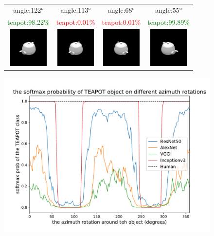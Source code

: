\begin{figure}[t]
\tabcolsep=0.03cm
   \begin{tabular}{cccc}
   angle:\ang{122} & angle:\ang{113} & angle:\ang{68} & angle:\ang{55} \\
    \textcolor{green}{teapot:98.22\%} &\textcolor{red}{teapot:0.01\%} &\textcolor{red}{teapot:0.01\%} &\textcolor{green}{teapot:99.89\%} \\ 
\includegraphics[trim={1.5cm 1.5cm 1.5cm 1.5cm},clip, width = 2cm]{images/intro/class_122.jpg} &
\includegraphics[trim={1.5cm 1.5cm 1.5cm 1.5cm},clip, width = 2cm]{images/intro/class_113.jpg}&
\includegraphics[trim={1.5cm 1.5cm 1.5cm 1.5cm},clip, width = 2cm]{images/intro/class_68.jpg} &
\includegraphics[trim={1.5cm 1.5cm 1.5cm 1.5cm},clip, width = 2cm]{images/intro/class_55.jpg} \\
\end{tabular}
      \includegraphics[trim={0.7cm 1.2cm 0.7cm 0.7cm},clip, width=\columnwidth]{images/azimuth_performance_TEAPOT.pdf}\\

\end{figure}
